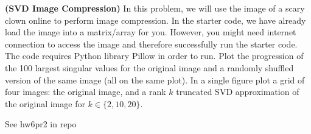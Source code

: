 \documentclass[12pt,letterpaper,fleqn]{hmcpset}
\begin{document}
\begin{problem}[2]
\textbf{(SVD Image Compression)}
In this problem, we will use the image of a scary clown online to perform image compression.  In the starter code, we have already load the image into a matrix/array for you. However, you might need internet connection to access the image and therefore successfully run the starter code. The code requires Python library Pillow in order to run.
\newline
\newline 
Plot the progression of the 100 largest singular values for the original image
and a randomly shuffled version of the same image (all on the same plot). In a single figure plot
a grid of four images: the original image, and a rank $k$ truncated SVD approximation of the original
image for $k\in\{2,10,20\}$.

\end{problem}
\begin{solution}
See hw6pr2 in repo

\vfill
\end{solution}
\newpage
\end{document}
